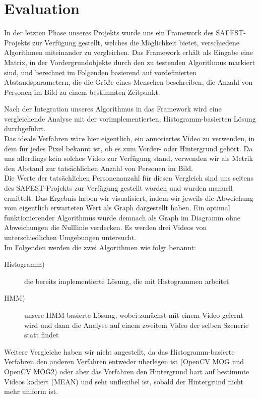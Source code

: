 \section{Evaluation}
\label{chap:evaluation}
In der letzten Phase unseres Projekts wurde uns ein Framework des SAFEST-Projekts\cite{safest} zur Verfügung gestellt, welches die Möglichkeit bietet, verschiedene Algorithmen miteinander zu vergleichen. Das Framework erhält als Eingabe eine Matrix, in der Vordergrundobjekte durch den zu testenden  Algorithmus markiert sind, und berechnet im Folgenden basierend auf vordefinierten Abstandsparametern, die die Größe eines Menschen beschreiben, die Anzahl von Personen im Bild zu einem bestimmten Zeitpunkt.

Nach der Integration unseres Algorithmus in das Framework wird eine vergleichende Analyse mit der vorimplementierten, Histogramm-basierten Lösung durchgeführt.\\
Das ideale Verfahren wäre hier eigentlich, ein annotiertes Video zu verwenden, in dem für jedes Pixel bekannt ist, ob es zum Vorder- oder Hintergrund gehört. Da uns allerdings kein solches Video zur Verfügung stand, verwenden wir als Metrik den Abstand zur tatsächlichen Anzahl von Personen im Bild.\\
Die Werte der tatsächlichen Personenanzahl für diesen Vergleich sind uns seitens des SAFEST-Projekts\cite{safest} zur Verfügung gestellt worden und wurden manuell ermittelt. Das Ergebnis haben wir visualisiert, indem wir jeweils die Abweichung vom eigentlich erwarteten Wert als Graph dargestellt haben. Ein optimal funktionierender Algorithmus würde demnach als Graph im Diagramm ohne Abweichungen die Nulllinie verdecken. Es werden drei Videos von unterschiedlichen Umgebungen untersucht.\\
Im Folgenden werden die zwei Algorithmen wie folgt benannt:
\begin{description}
	\item[Histogramm)] die bereits implementierte Lösung, die mit Histogrammen arbeitet
	\item[HMM)] unsere HMM-basierte Lösung, wobei zunächst mit einem Video gelernt wird und dann die Analyse auf einem zweitem Video der selben Szenerie statt findet
\end{description}
Weitere Vergleiche haben wir nicht angestellt, da das Histogramm-basierte Verfahren den anderen Verfahren entweder überlegen ist (OpenCV MOG und OpenCV MOG2\cite{opencv}) oder aber das Verfahren den Hintergrund hart auf bestimmte Videos kodiert (MEAN) und sehr unflexibel ist, sobald der Hintergrund nicht mehr uniform ist.

